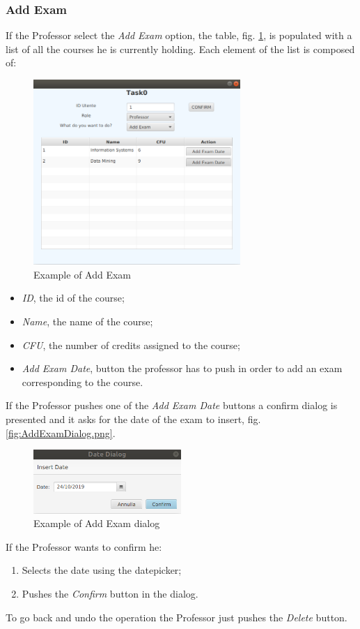 \documentclass{report}
\begin{document}
\subsubsection*{Add Exam}
If the Professor select the \textit{Add Exam} option, the table, fig. \ref{fig:AddExam}, is populated with a list of all the courses he is currently holding. Each element of the list is composed of:
\begin{figure} [h!]
	\centering
	\includegraphics[width=0.7\textwidth]{AddExam.png}
	\caption{Example of Add Exam}
	\label{fig:AddExam}
\end{figure}
\begin{itemize}
	\item \textit{ID}, the id of the course;
	\item \textit{Name}, the name of the course;
	\item \textit{CFU}, the number of credits assigned to the course;
	\item \textit{Add Exam Date}, button the professor has to push in order to add an exam corresponding to the course. 
\end{itemize}

If the Professor pushes one of the \textit{Add Exam Date} buttons a confirm dialog is presented and it asks for the date of the exam to insert, fig. \ref{fig:AddExamDialog.png}.
\begin{figure} [h!]
	\centering
	\includegraphics[width=0.5\textwidth]{AddExamDialog.png}
	\caption{Example of Add Exam dialog}
	\label{fig:AddExamDialog}
\end{figure} 
If the Professor wants to confirm he:
\begin{enumerate}
	\item Selects the date using the datepicker;
	\item Pushes the \textit{Confirm} button in the dialog.
\end{enumerate}
To go back and undo the operation the Professor just pushes the \textit{Delete} button.
\end{document}
